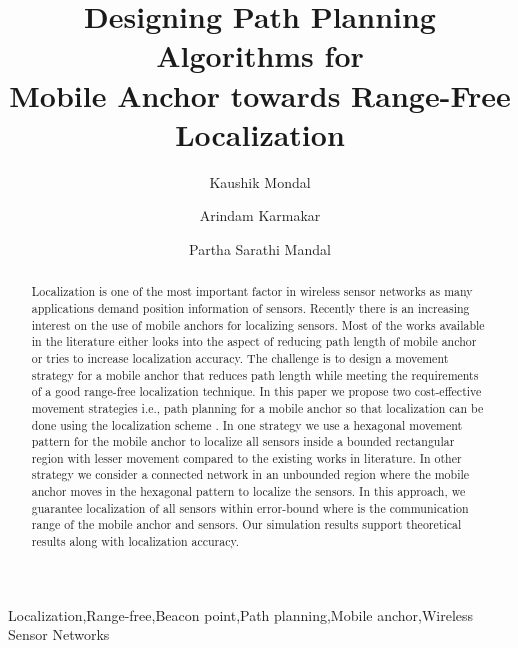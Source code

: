 \documentclass[preprint,11pt]{elsarticle}
\begin{document}
\begin{frontmatter}

\title{Designing Path Planning Algorithms for\\ Mobile Anchor towards Range-Free Localization}
\author[label1]{Kaushik Mondal}
\author[label2]{Arindam Karmakar}
\author[label1]{Partha Sarathi Mandal}
\address[label1]{Indian Institute of Technology Guwahati, India}
\address[label2]{Tezpur University, India}







\begin{abstract}
Localization is one of the most important factor in wireless sensor networks as
many applications demand position information of sensors.
Recently there is an increasing interest on the use of mobile anchors for localizing sensors.
Most of the works available in the literature either looks into the aspect of reducing path
length of mobile anchor or tries to increase localization accuracy.
The challenge is to design a movement strategy for a mobile anchor that reduces path length
while meeting the requirements of a good range-free localization technique.
In this paper we propose two cost-effective movement strategies i.e., path planning for a mobile anchor
so that localization can be done using the localization scheme \cite{Lee2009}.
In one strategy we use a hexagonal movement pattern for the mobile anchor to localize all sensors inside a bounded
rectangular region with lesser movement compared to the existing works in literature.
In other strategy we consider a connected network in an unbounded region where the mobile anchor
moves in the hexagonal pattern to localize the sensors. In this approach, we guarantee localization of
all sensors within  error-bound where  is the communication range of the mobile anchor and sensors.
Our simulation results support theoretical results along with localization accuracy.
\end{abstract}

\begin{keyword}
Localization\sep Range-free\sep Beacon point\sep Path planning\sep Mobile anchor\sep Wireless Sensor Networks
\end{keyword}

\end{frontmatter}
\end{document}
